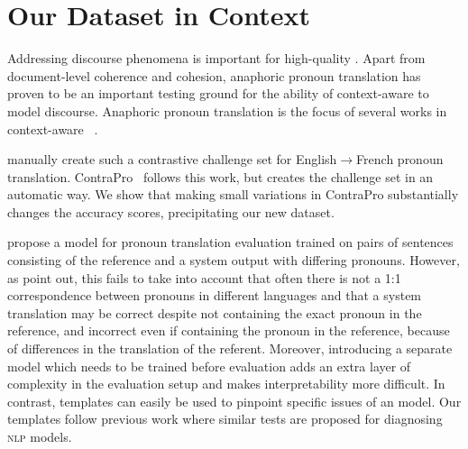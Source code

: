 \section{Our Dataset in Context}

Addressing discourse phenomena is important for high-quality .  
%
Apart from document-level coherence and cohesion, anaphoric pronoun translation has proven to be  an important testing ground for the ability of context-aware \nmt{} to model discourse. 
%
Anaphoric pronoun translation is the focus of several works in context-aware \nmt{}~\citep{bawden-etal-2018-evaluating,voita2018anaphora,stojanovski-fraser-2018-coreference,miculicich2018documentnmt,voita2019good,maruf2019selective}. 

\citet{bawden-etal-2018-evaluating} manually create such a contrastive challenge set for English$\rightarrow$French pronoun translation. 
%
ContraPro~\citep{mueller2018} follows this work, but creates the challenge set in an automatic way. 
%
We show that making small variations in ContraPro substantially changes the accuracy scores, precipitating our new dataset.


\citet{jwalapuram-etal-2019-evaluating} propose 
a model for pronoun translation evaluation 
trained on pairs of sentences
consisting of the reference and a system output with differing pronouns.
%
However, as \citet{guillou-hardmeier-2018-automatic} point out, this fails to take into account that often there is not a 1:1 correspondence between pronouns in different languages and that a system translation may be
correct
despite not containing the exact
pronoun in the reference, and incorrect even if containing the pronoun in the reference, because of differences in the translation of the referent.
%
Moreover, introducing a separate model which needs to be trained before evaluation adds an extra layer of complexity in the evaluation setup and makes interpretability more difficult. 
In contrast, templates can easily be used to pinpoint specific issues of an \nmt{} model.
%
Our templates follow previous work \citep{ribeiro-etal-2018-semantically,mccoy2019right,ribeiro2020beyond}
where similar tests are proposed for diagnosing \textsc{nlp} models.

